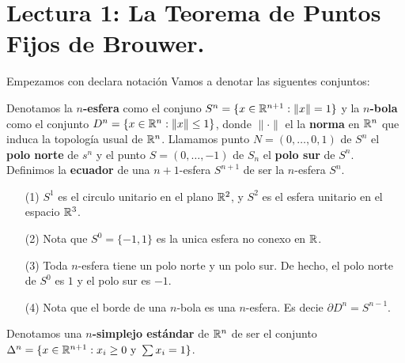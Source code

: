 \section*{Lectura 1: La Teorema de Puntos Fijos de Brouwer.}

Empezamos con declara notaci\'on Vamos a denotar las siguentes conjuntos:

\begin{definition}
    Denotamos la \textbf{$n$-esfera} como el conjuno $S^n=\{x \in
    \mathbb{R}^{n+1} : \|x\|=1\}$ y la \textbf{$n$-bola} como el conjunto $D^n=\{x
    \in \mathbb{R}^{n} : \|x\| \leq 1\}$, donde $\|\cdot\|$ el la \textbf{norma} en
    $\mathbb{R}^n$ que induca la topolog\'ia usual de $\mathbb{R}^n$. Llamamos punto
    $N=(0,\dots,0,1)$ de $S^n$ el \textbf{polo norte} de $s^n$ y el punto $S=(0,
    \dots, -1)$ de $S_n$ el  \textbf{polo sur} de $S^n$. Definimos la
    \textbf{ecuador} de una $n+1$-esfera $S^{n+1}$ de ser la $n$-esfera $S^n$.
\end{definition}

\begin{example}\label{exmp_1}
    \begin{enumerate}
        \item[(1)] $S^1$ es el circulo unitario en el plano $\mathbb{R}^2$, y  $S^2$ es
            el esfera unitario en el espacio $\mathbb{R}^3$.

        \item[(2)] Nota que $S^0=\{-1,1\}$ es la unica esfera no conexo en $\mathbb{R}$.

        \item[(3)] Toda $n$-esfera tiene un polo norte y un polo sur. De hecho,
            el polo norte de $S^0$ es $1$ y el polo sur es $-1$.

        \item[(4)] Nota que el borde de una $n$-bola es una  $n$-esfera. Es
            decie  $\partial{D^n}=S^{n-1}$.
    \end{enumerate}
\end{example}

\begin{definition}
    Denotamos una \textbf{$n$-simplejo est\'andar} de $\mathbb{R}^n$ de ser el conjunto
    $\Delta^n=\{x \in \mathbb{R}^{n+1} : x_i \geq 0 \text{ y } \sum{x_i}=1\}$.
\end{definition}

